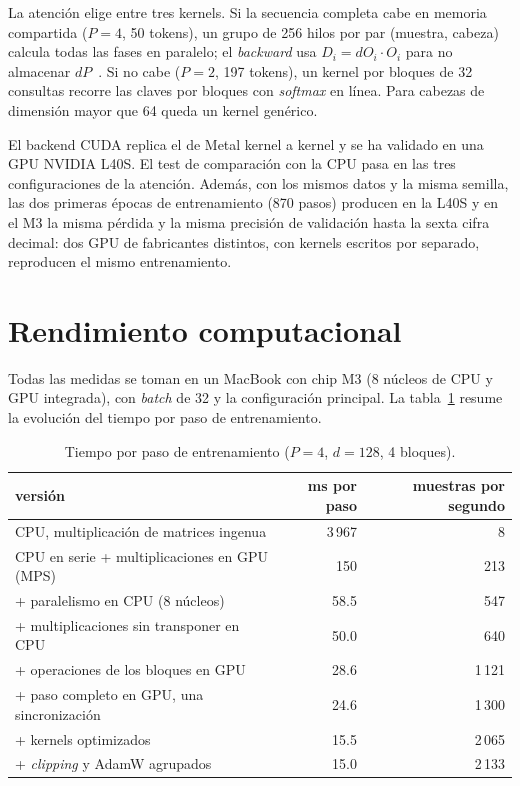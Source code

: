 \documentclass[11pt,a4paper]{article}
\begin{document}
La atención elige entre tres kernels. Si la secuencia completa cabe en memoria
compartida ($P=4$, 50 tokens), un grupo de 256 hilos por par (muestra, cabeza)
calcula todas las fases en paralelo; el \emph{backward} usa
$D_i = dO_i\cdot O_i$ para no almacenar $dP$~\cite{flashattention}. Si no cabe
($P=2$, 197 tokens), un kernel por bloques de 32 consultas recorre las claves
por bloques con \emph{softmax} en línea. Para cabezas de dimensión mayor que 64
queda un kernel genérico.

El backend CUDA replica el de Metal kernel a kernel y se ha validado en una GPU
NVIDIA L40S. El test de comparación con la CPU pasa en las tres configuraciones
de la atención. Además, con los mismos datos y la misma semilla, las dos
primeras épocas de entrenamiento (870 pasos) producen en la L40S y en el M3 la
misma pérdida y la misma precisión de validación hasta la sexta cifra decimal:
dos GPU de fabricantes distintos, con kernels escritos por separado, reproducen
el mismo entrenamiento.

\section{Rendimiento computacional}

Todas las medidas se toman en un MacBook con chip M3 (8 núcleos de CPU y GPU
integrada), con \emph{batch} de 32 y la configuración principal. La
tabla~\ref{tab:rendimiento} resume la evolución del tiempo por paso de
entrenamiento.

\begin{table}[H]
  \centering\small
  \begin{tabular}{lrr}
    \toprule
    versión & ms por paso & muestras por segundo \\
    \midrule
    CPU, multiplicación de matrices ingenua       & 3\,967 & 8 \\
    CPU en serie + multiplicaciones en GPU (MPS)  & 150    & 213 \\
    + paralelismo en CPU (8 núcleos)              & 58.5   & 547 \\
    + multiplicaciones sin transponer en CPU      & 50.0   & 640 \\
    + operaciones de los bloques en GPU           & 28.6   & 1\,121 \\
    + paso completo en GPU, una sincronización    & 24.6   & 1\,300 \\
    + kernels optimizados                         & 15.5   & 2\,065 \\
    + \emph{clipping} y AdamW agrupados           & 15.0   & 2\,133 \\
    \bottomrule
  \end{tabular}
  \caption{Tiempo por paso de entrenamiento ($P=4$, $d=128$, 4 bloques).}
  \label{tab:rendimiento}
\end{table}
\end{document}

